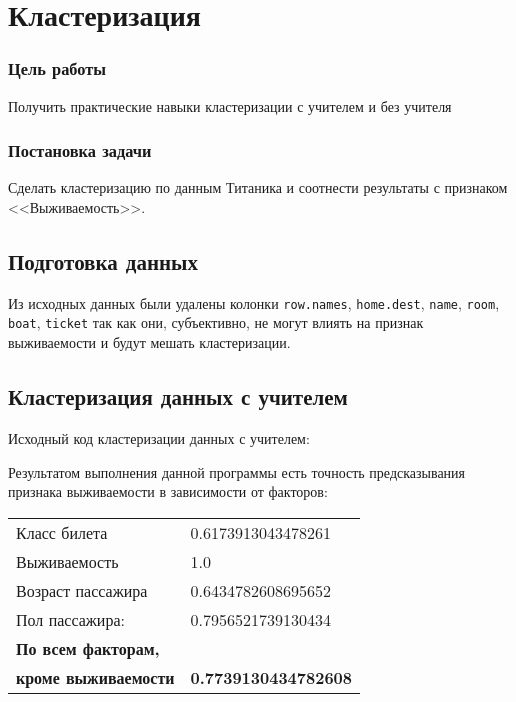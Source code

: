 



\newcommand{\labnumber}{3} %



\graphicspath{{figures/}}


\Russian


\addtocounter{page}{1}

\section*{Кластеризация}
\subsubsection*{Цель работы}
Получить практические навыки кластеризации с учителем и без учителя
\subsubsection*{Постановка задачи}
Сделать кластеризацию по данным Титаника и соотнести результаты с признаком <<Выживаемость>>.

\subsection*{Подготовка данных}
Из исходных данных были удалены колонки \texttt{row.names}, \texttt{home.dest}, \texttt{name}, \texttt{room}, \texttt{boat}, \texttt{ticket} так как они, субъективно, не могут влиять на признак выживаемости и будут мешать кластеризации.

\subsection*{Кластеризация данных с учителем}
Исходный код кластеризации данных с учителем:  
 

Результатом выполнения данной программы есть точность предсказывания признака выживаемости в зависимости от факторов:

\begin{table}[H]
  \begin{tabular}{l|l}
    Класс билета & 0.6173913043478261 \\
	Выживаемость & 1.0 \\
	Возраст пассажира & 0.6434782608695652 \\
	Пол пассажира: & 0.7956521739130434 \\\hline
	\textbf{По всем факторам,} \\ \textbf{кроме выживаемости} & \textbf{0.7739130434782608} \\
  \end{tabular}
  \label{tab:main_1_results}
\end{table}

